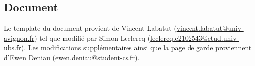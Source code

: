 \documentclass{ceri/sty/rapport}
\begin{document}
\subsection{Document}
Le template du document provient de Vincent Labatut (\url{vincent.labatut@univ-avignon.fr}) tel que modifié par Simon Leclercq (\url{leclercq.e2102543@etud.univ-ubs.fr}).
Les modifications supplémentaires ainsi que la page de garde proviennent d'Ewen Deniau (\url{ewen.deniau@student-cs.fr}).

\nocite{*}
\end{document}
